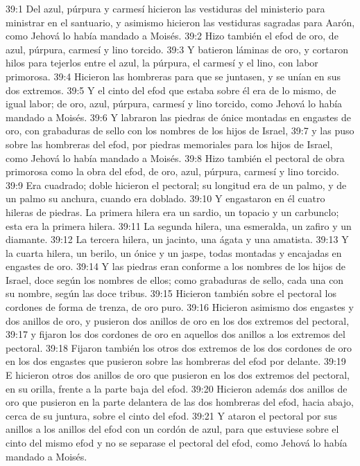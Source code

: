 39:1 Del azul, púrpura y carmesí hicieron las vestiduras del ministerio para ministrar en el santuario, y asimismo hicieron las vestiduras sagradas para Aarón, como Jehová lo había mandado a Moisés. 
39:2 Hizo también el efod de oro, de azul, púrpura, carmesí y lino torcido. 
39:3 Y batieron láminas de oro, y cortaron hilos para tejerlos entre el azul, la púrpura, el carmesí y el lino, con labor primorosa. 
39:4 Hicieron las hombreras para que se juntasen, y se unían en sus dos extremos. 
39:5 Y el cinto del efod que estaba sobre él era de lo mismo, de igual labor; de oro, azul, púrpura, carmesí y lino torcido, como Jehová lo había mandado a Moisés. 
39:6 Y labraron las piedras de ónice montadas en engastes de oro, con grabaduras de sello con los nombres de los hijos de Israel, 
39:7 y las puso sobre las hombreras del efod, por piedras memoriales para los hijos de Israel, como Jehová lo había mandado a Moisés. 
39:8 Hizo también el pectoral de obra primorosa como la obra del efod, de oro, azul, púrpura, carmesí y lino torcido. 
39:9 Era cuadrado; doble hicieron el pectoral; su longitud era de un palmo, y de un palmo su anchura, cuando era doblado. 
39:10 Y engastaron en él cuatro hileras de piedras. La primera hilera era un sardio, un topacio y un carbunclo; esta era la primera hilera. 
39:11 La segunda hilera, una esmeralda, un zafiro y un diamante. 
39:12 La tercera hilera, un jacinto, una ágata y una amatista. 
39:13 Y la cuarta hilera, un berilo, un ónice y un jaspe, todas montadas y encajadas en engastes de oro. 
39:14 Y las piedras eran conforme a los nombres de los hijos de Israel, doce según los nombres de ellos; como grabaduras de sello, cada una con su nombre, según las doce tribus. 
39:15 Hicieron también sobre el pectoral los cordones de forma de trenza, de oro puro. 
39:16 Hicieron asimismo dos engastes y dos anillos de oro, y pusieron dos anillos de oro en los dos extremos del pectoral, 
39:17 y fijaron los dos cordones de oro en aquellos dos anillos a los extremos del pectoral. 
39:18 Fijaron también los otros dos extremos de los dos cordones de oro en los dos engastes que pusieron sobre las hombreras del efod por delante. 
39:19 E hicieron otros dos anillos de oro que pusieron en los dos extremos del pectoral, en su orilla, frente a la parte baja del efod. 
39:20 Hicieron además dos anillos de oro que pusieron en la parte delantera de las dos hombreras del efod, hacia abajo, cerca de su juntura, sobre el cinto del efod. 
39:21 Y ataron el pectoral por sus anillos a los anillos del efod con un cordón de azul, para que estuviese sobre el cinto del mismo efod y no se separase el pectoral del efod, como Jehová lo había mandado a Moisés. 
